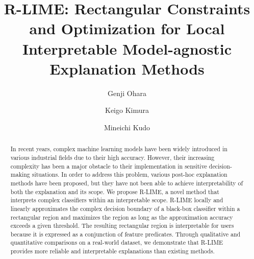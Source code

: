 \documentclass[runningheads]{llncs}
\begin{document}
\newcommand{\sampleindex}[1]{\ifnum#1=0 \Asample\else\Bsample\fi}
\def\AB#1{\ifnum#1=0 A\else B\fi}

\title{%
  R-LIME\@: Rectangular Constraints and Optimization for Local Interpretable
  Model-agnostic Explanation Methods
}


\author{Genji Ohara \and %
  Keigo Kimura \and      %
  Mineichi Kudo          %
}



\maketitle

\begin{abstract}
  In recent years,
  complex machine learning models have been widely introduced
  in various industrial fields due to their high accuracy.
  However,
  their increasing complexity has been a major obstacle to their implementation
  in sensitive decision-making situations.
  In order to address this problem,
  various post-hoc explanation methods have been proposed,
  but they have not been able to achieve interpretability of
  both the explanation and its scope.
  We propose R-LIME, a novel method that interprets complex classifiers
  within an interpretable scope.
  R-LIME locally and linearly approximates the complex decision boundary
  of a black-box classifier within a rectangular region
  and maximizes the region as long as the approximation accuracy
  exceeds a given threshold.
  The resulting rectangular region is interpretable for users because it is
  expressed as a conjunction of feature predicates.
  Through qualitative and quantitative comparisons on a real-world dataset,
  we demonstrate that R-LIME provides more reliable and interpretable
  explanations than existing methods.
\end{abstract}
\end{document}

